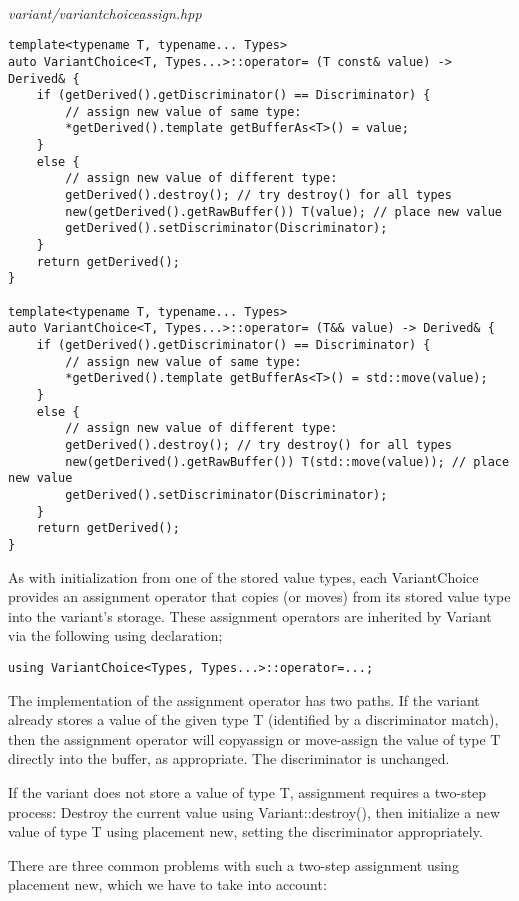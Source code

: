 \hspace*{\fill} \\ %
\noindent
\textit{variant/variantchoiceassign.hpp}
\begin{lstlisting}[style=styleCXX]
template<typename T, typename... Types>
auto VariantChoice<T, Types...>::operator= (T const& value) -> Derived& {
	if (getDerived().getDiscriminator() == Discriminator) {
		// assign new value of same type:
		*getDerived().template getBufferAs<T>() = value;
	}
	else {
		// assign new value of different type:
		getDerived().destroy(); // try destroy() for all types
		new(getDerived().getRawBuffer()) T(value); // place new value
		getDerived().setDiscriminator(Discriminator);
	}
	return getDerived();
}

template<typename T, typename... Types>
auto VariantChoice<T, Types...>::operator= (T&& value) -> Derived& {
	if (getDerived().getDiscriminator() == Discriminator) {
		// assign new value of same type:
		*getDerived().template getBufferAs<T>() = std::move(value);
	}
	else {
		// assign new value of different type:
		getDerived().destroy(); // try destroy() for all types
		new(getDerived().getRawBuffer()) T(std::move(value)); // place new value
		getDerived().setDiscriminator(Discriminator);
	}
	return getDerived();
}
\end{lstlisting}

As with initialization from one of the stored value types, each VariantChoice provides an assignment operator that copies (or moves) from its stored value type into the variant’s storage. These assignment operators are inherited by Variant via the following using declaration;

\begin{lstlisting}[style=styleCXX]
using VariantChoice<Types, Types...>::operator=...;
\end{lstlisting}

The implementation of the assignment operator has two paths. If the variant already stores a value of the given type T (identified by a discriminator match), then the assignment operator will copyassign or move-assign the value of type T directly into the buffer, as appropriate. The discriminator is unchanged.

If the variant does not store a value of type T, assignment requires a two-step process: Destroy the current value using Variant::destroy(), then initialize a new value of type T using placement new, setting the discriminator appropriately.

There are three common problems with such a two-step assignment using placement new, which we have to take into account:

